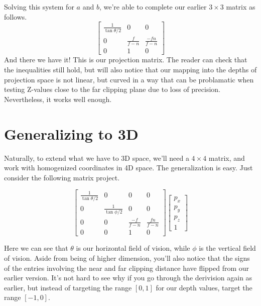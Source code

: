 \documentclass[12pt]{article}
\begin{document}
Solving this system for $a$ and $b$, we're able to complete our earlier $3\times 3$ matrix as follows.
\begin{equation*}
\left[
\begin{array}{ccc}
\frac{1}{\tan\theta/2} & 0 & 0 \\
0 & \frac{f}{f-n} & \frac{-fn}{f-n} \\
0 & 1 & 0
\end{array}
\right]
\end{equation*}
And there we have it!  This is our projection matrix.  The reader can check that the inequalities still hold, but will also notice that our mapping into the depths of projection space is not linear, but curved in a way that can be problamatic when testing Z-values close to the far clipping plane due to loss of precision.  Nevertheless, it works well enough.

\section*{Generalizing to 3D}

Naturally, to extend what we have to 3D space, we'll need a $4\times 4$ matrix, and work with homogenized coordinates in 4D space.  The generalization is easy.  Just consider the following matrix project.

\begin{equation*}
\left[
\begin{array}{cccc}
\frac{1}{\tan\theta/2} & 0 & 0 & 0 \\
0 & \frac{1}{\tan\phi/2} & 0 & 0 \\
0 & 0 & \frac{-f}{f-n} & \frac{fn}{f-n} \\
0 & 0 & 1 & 0
\end{array}
\right]\left[
\begin{array}{c}
p_x \\
p_y \\
p_z \\
1
\end{array}
\right]
\end{equation*}

Here we can see that $\theta$ is our horizontal field of vision, while $\phi$ is the vertical field of vision.  Aside from being of higher dimension, you'll also notice that the signs of the entries involving the near and far clipping distance have flipped from our earlier version.  It's not hard to see why if you go through the derivision again as earlier, but instead of targeting the range $[0,1]$ for our depth values, target the range $[-1,0]$.
\end{document}
